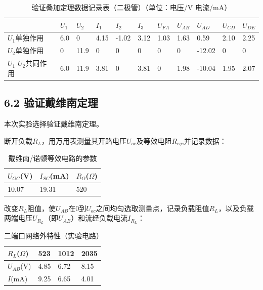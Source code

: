 \documentclass[12pt,a4paper]{article}
\begin{document}
\begin{table}[H]
\centering
\caption{验证叠加定理数据记录表（二极管）（单位：电压/V 电流/mA）} 
\renewcommand{\arraystretch}{1.2}
\footnotesize
\begin{tabular}{|p{2.6cm}|p{1cm}|p{1cm}|p{1cm}|p{1cm}|p{1cm}|p{1cm}|p{1cm}|p{1.0cm}|p{1cm}|p{1cm}|}
\hline
& $U_{1}$ & $U_{2}$ & $I_{1}$ & $I_{2}$ & $I_{3}$ & $U_{FA}$ & $U_{AB}$ & $U_{AD}$ & $U_{CD}$ & $U_{DE}$ \\
\hline
$U_{1}$单独作用 &6.0 &0 &4.15 &-1.02 &3.12 &1.03 &1.63 &0.59 &2.10 &2.25 \\
\hline
$U_{2}$单独作用 &0 &11.9 &0 &0 &0 &0 &0 &-12.02 &0 &0 \\
\hline
$U_{1}$ $U_{2}$共同作用 &6.0 &11.9 &3.81 &0 &3.81 &0 &1.98 &-10.04 &1.95 &2.07 \\
\hline
\end{tabular}

\end{table}

\subsection*{6.2 验证戴维南定理}

本次实验选择验证戴维南定理。

断开负载$R_{L}$，用万用表测量其开路电压$U_{oc}$及等效电阻$R_{eq}$,并记录数据：



\begin{table}[H]
\centering
\caption{戴维南/诺顿等效电路的参数} 
\renewcommand{\arraystretch}{1.2}
\small
\begin{tabular}{|p{1.5cm}|p{1.5cm}|p{1.5cm}|}
\hline
 $U_{OC}$(V) & $I_{SC}$(mA) & $R_{O}$($\Omega$) \\
\hline
 10.07 &19.31 &520 \\
\hline


\end{tabular}

\end{table}

改变$R_{L}$阻值，使$U_{AB}$在0到$U_{oc}$之间均匀选取测量点，记录负载阻值$R_{L}$，以及负载两端电压$U_{R_{L}}$（即$U_{AB}$）和流经负载电流$I_{R_{L}}$：

\begin{table}[H]
\centering
\caption{二端口网络外特性（实验电路）} 
\renewcommand{\arraystretch}{1.2}
\small
\begin{tabular}{|p{1.5cm}|p{1.5cm}|p{1.5cm}|p{1.5cm}|}
\hline
 $R_{L}$($\Omega$)& 523 & 1012 & 2035 \\
\hline
$U_{AB}$(V) & 4.85 & 6.72 & 8.15\\
\hline
$I$(mA) & 9.25 & 6.65 & 4.01\\
\hline
\end{tabular}
\end{table}
\end{document}
